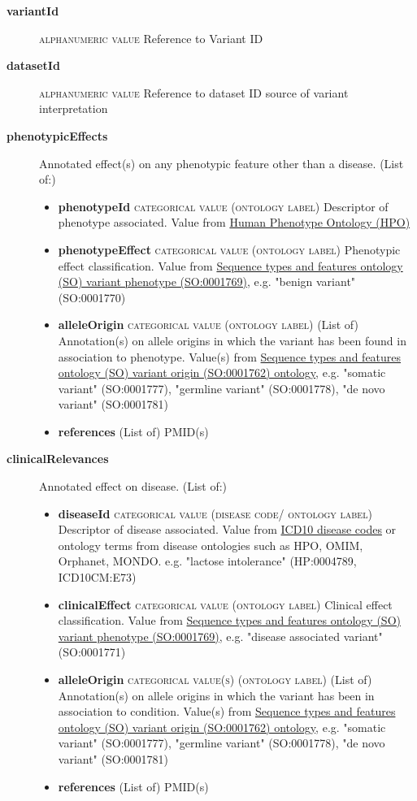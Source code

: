\documentclass[a4paper, 10pt]{article}        %
\begin{document}
  \begin{description}
  	\item[\textbf{variantId}] {\textsc{alphanumeric value}} Reference to Variant ID 		\item[\textbf{datasetId}] {\textsc{alphanumeric value}} Reference to dataset ID source of variant interpretation
	\item[\textbf{phenotypicEffects}] Annotated effect(s) on any phenotypic feature other than a disease. (List of:)
	\begin{itemize}
				\item[] \textbf{phenotypeId} {\textsc{categorical value (ontology label)}} Descriptor of phenotype associated. Value from \href{http:purl.obolibrary.org/obo/HP_0000001}{Human Phenotype Ontology (HPO)}
				\item[] \textbf{phenotypeEffect} {\textsc{categorical value (ontology label)}} Phenotypic effect classification. Value from \href{http://purl/obolibrary.org/obo/SO_0001769}{Sequence types and features ontology (SO) variant phenotype (SO:0001769)}, e.g. "benign variant" (SO:0001770)
				\item[] \textbf{alleleOrigin} {\textsc{categorical value (ontology label)}} (List of) Annotation(s) on allele origins in which the variant has been found in association to phenotype. Value(s) from \href{http://purl.obolibrary.org/obo/SO_0001762}{Sequence types and features ontology (SO) variant origin (SO:0001762) ontology}, e.g. "somatic variant" (SO:0001777), "germline variant" (SO:0001778), "de novo variant" (SO:0001781)
				\item[] \textbf{references} (List of) PMID(s)
	\end{itemize} 
	\item[\textbf{clinicalRelevances}] Annotated effect on disease. (List of:)
			\begin{itemize}
				\item[] \textbf{diseaseId} {\textsc{categorical value (disease code/ ontology label)}} Descriptor of disease associated. Value from \href{https://www.who.int/classifications/icd/en/}{ICD10 disease codes} or ontology terms from disease ontologies such as HPO, OMIM, Orphanet, MONDO. e.g. "lactose intolerance" (HP:0004789, ICD10CM:E73)
				\item[] \textbf{clinicalEffect} {\textsc{categorical value (ontology label)}} Clinical effect classification. Value from \href{http://purl/obolibrary.org/obo/SO_0001769}{Sequence types and features ontology (SO) variant phenotype (SO:0001769)}, e.g. "disease associated variant" (SO:0001771)
				\item[] \textbf{alleleOrigin} {\textsc{categorical value(s) (ontology label)}} (List of) Annotation(s) on allele origins in which the variant has been in association to condition. Value(s) from \href{http://purl.obolibrary.org/obo/SO_0001762}{Sequence types and features ontology (SO) variant origin (SO:0001762) ontology}, e.g. "somatic variant" (SO:0001777), "germline variant" (SO:0001778), "de novo variant" (SO:0001781)
				\item[] \textbf{references} (List of) PMID(s)
		 \end{itemize} 


\end{description}
\end{document}
